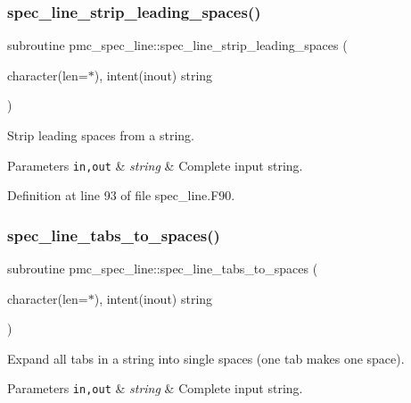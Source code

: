 \subsubsection{\texorpdfstring{spec\+\_\+line\+\_\+strip\+\_\+leading\+\_\+spaces()}{spec\_line\_strip\_leading\_spaces()}}
{\footnotesize\ttfamily subroutine pmc\+\_\+spec\+\_\+line\+::spec\+\_\+line\+\_\+strip\+\_\+leading\+\_\+spaces (\begin{DoxyParamCaption}\item[{character(len=$\ast$), intent(inout)}]{string }\end{DoxyParamCaption})}



Strip leading spaces from a string. 


\begin{DoxyParams}[1]{Parameters}
\mbox{\tt in,out}  & {\em string} & Complete input string. \\
\hline
\end{DoxyParams}


Definition at line 93 of file spec\+\_\+line.\+F90.

\mbox{\label{namespacepmc__spec__line_a8bcfccca38c2d4044b3ab638b119f108}} 
\subsubsection{\texorpdfstring{spec\+\_\+line\+\_\+tabs\+\_\+to\+\_\+spaces()}{spec\_line\_tabs\_to\_spaces()}}
{\footnotesize\ttfamily subroutine pmc\+\_\+spec\+\_\+line\+::spec\+\_\+line\+\_\+tabs\+\_\+to\+\_\+spaces (\begin{DoxyParamCaption}\item[{character(len=$\ast$), intent(inout)}]{string }\end{DoxyParamCaption})}



Expand all tabs in a string into single spaces (one tab makes one space). 


\begin{DoxyParams}[1]{Parameters}
\mbox{\tt in,out}  & {\em string} & Complete input string. \\
\hline
\end{DoxyParams}


